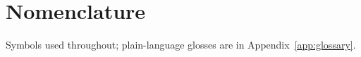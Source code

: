 \documentclass[12pt]{article}
\begin{document}
\begin{abstract}
The substantive contributions are thus the pricing methodology and its replicated null
(packaged as a screening rule for when passive dependence modelling fails); the scheduler
measurement (RQ1) and the exploratory price-of-robustness rule (RQ3) support these, all under
$202$ unit tests with the Phase~1--2 falsification protocol pre-committed.
\end{abstract}
\newpage
\tableofcontents
\newpage

\listoffigures
\listoftables
\newpage

\section*{Nomenclature}
\noindent Symbols used throughout; plain-language glosses are in
Appendix~\ref{app:glossary}.
\end{document}
